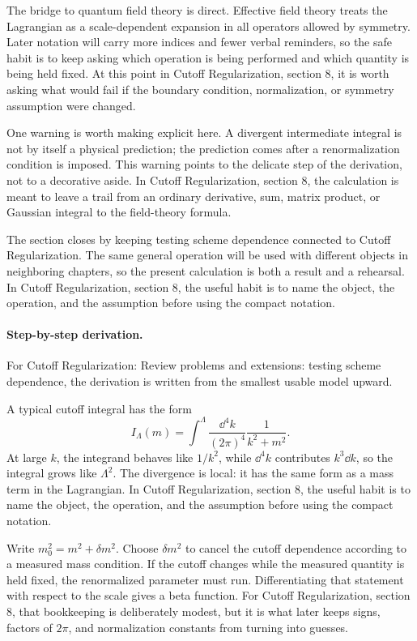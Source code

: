 The bridge to quantum field theory is direct.  Effective field theory treats the Lagrangian as a scale-dependent expansion in all operators allowed by symmetry.  Later notation will carry more indices and fewer verbal reminders, so the safe habit is to keep asking which operation is being performed and which quantity is being held fixed.  At this point in Cutoff Regularization, section 8, it is worth asking what would fail if the boundary condition, normalization, or symmetry assumption were changed.

One warning is worth making explicit here.  A divergent intermediate integral is not by itself a physical prediction; the prediction comes after a renormalization condition is imposed.  This warning points to the delicate step of the derivation, not to a decorative aside.  In Cutoff Regularization, section 8, the calculation is meant to leave a trail from an ordinary derivative, sum, matrix product, or Gaussian integral to the field-theory formula.

The section closes by keeping testing scheme dependence connected to Cutoff Regularization.  The same general operation will be used with different objects in neighboring chapters, so the present calculation is both a result and a rehearsal.  In Cutoff Regularization, section 8, the useful habit is to name the object, the operation, and the assumption before using the compact notation.



\paragraph{Step-by-step derivation.}

For Cutoff Regularization: Review problems and extensions: testing scheme dependence, the derivation is written from the smallest usable model upward.

A typical cutoff integral has the form
\[
  I_\Lambda(m)=\int^{\Lambda}\frac{\dd^4k}{(2\pi)^4}\frac{1}{k^2+m^2}.
\]
At large \(k\), the integrand behaves like \(1/k^2\), while \(\dd^4k\) contributes \(k^3\dd k\), so the integral grows like \(\Lambda^2\).  The divergence is local: it has the same form as a mass term in the Lagrangian.  In Cutoff Regularization, section 8, the useful habit is to name the object, the operation, and the assumption before using the compact notation.

Write \(m_0^2=m^2+\delta m^2\).  Choose \(\delta m^2\) to cancel the cutoff dependence according to a measured mass condition.  If the cutoff changes while the measured quantity is held fixed, the renormalized parameter must run.  Differentiating that statement with respect to the scale gives a beta function.  For Cutoff Regularization, section 8, that bookkeeping is deliberately modest, but it is what later keeps signs, factors of \(2\pi\), and normalization constants from turning into guesses.

